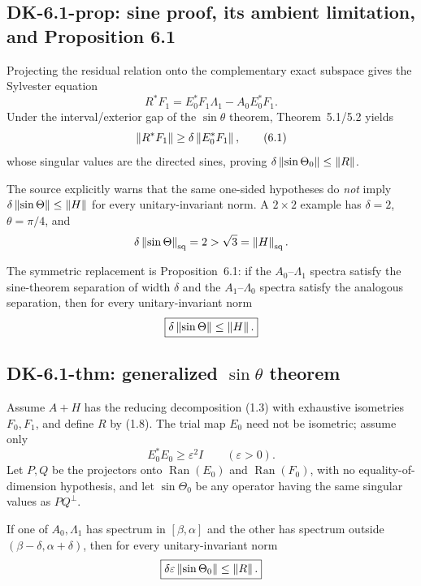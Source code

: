 \subsection*{DK-6.1-prop: sine proof, its ambient limitation, and Proposition 6.1}
Projecting the residual relation onto the complementary exact subspace gives the Sylvester equation
\[
 R^*F_1=E_0^*F_1\Lambda_1-A_0E_0^*F_1.
\]
Under the interval/exterior gap of the $\sin\theta$ theorem, Theorem~5.1/5.2 yields
\begin{equation}
 \left\lVert R^*F_1\right\rVert\ge\delta\left\lVert E_0^*F_1\right\rVert,
 \tag{6.1}
\end{equation}
whose singular values are the directed sines, proving $\delta\left\lVert \sin\Theta_0\right\rVert\le\left\lVert R\right\rVert$.

The source explicitly warns that the same one-sided hypotheses do \emph{not} imply $\delta\left\lVert \sin\Theta\right\rVert\le\left\lVert H\right\rVert$ for every unitary-invariant norm.  A $2\times2$ example has $\delta=2$, $\theta=\pi/4$, and
\[
 \delta\left\lVert \sin\Theta\right\rVert_{\mathrm{sq}}=2>\sqrt3=\left\lVert H\right\rVert_{\mathrm{sq}}.
\]

The symmetric replacement is Proposition~6.1: if the $A_0$--$\Lambda_1$ spectra satisfy the sine-theorem separation of width $\delta$ and the $A_1$--$\Lambda_0$ spectra satisfy the analogous separation, then for every unitary-invariant norm
\[
 \boxed{\delta\left\lVert \sin\Theta\right\rVert\le\left\lVert H\right\rVert.}
\]

\subsection*{DK-6.1-thm: generalized $\sin\theta$ theorem}
Assume $A+H$ has the reducing decomposition (1.3) with exhaustive isometries $F_0,F_1$, and define $R$ by (1.8).  The trial map $E_0$ need not be isometric; assume only
\[
 E_0^*E_0\ge\varepsilon^2 I\qquad(\varepsilon>0).
\]
Let $P,Q$ be the projectors onto $\operatorname{Ran}(E_0)$ and $\operatorname{Ran}(F_0)$, with no equality-of-dimension hypothesis, and let $\sin\Theta_0$ be any operator having the same singular values as $PQ^\perp$.

If one of $A_0,\Lambda_1$ has spectrum in $[\beta,\alpha]$ and the other has spectrum outside $(\beta-\delta,\alpha+\delta)$, then for every unitary-invariant norm
\[
 \boxed{\delta\varepsilon\left\lVert \sin\Theta_0\right\rVert\le\left\lVert R\right\rVert.}
\]

